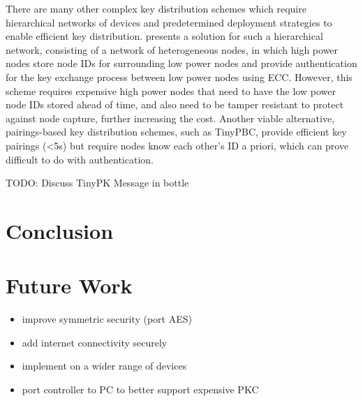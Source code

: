 \documentclass[conference]{./sty/IEEEtran}
\begin{document}
There are many other complex key distribution schemes which require hierarchical networks of devices \cite{MizanurRahman2010858,Shi2013235} and predetermined deployment strategies to enable efficient key distribution. \cite{MizanurRahman2010858} presents a solution for such a hierarchical network, consisting of a network of heterogeneous nodes, in which high power nodes store node IDs for surrounding low power nodes and provide authentication for the key exchange process between low power nodes using ECC. However, this scheme requires expensive high power nodes that need to have the low power node IDs stored ahead of time, and also need to be tamper resistant to protect against node capture, further increasing the cost. Another viable alternative, pairings-based key distribution schemes, such as TinyPBC\cite{TinyPBC}, provide efficient key pairings (\textless5s) but require nodes know each other's ID a priori, which can prove difficult to do with authentication. 

TODO: Discuss TinyPK  \cite{TinyPK}Message in bottle \cite{MessageBottle}


\section{Conclusion}
\label{sec:conclusion}

\section{Future Work} %
\label{sec:future_work}

\begin{itemize}
  \item improve symmetric security (port AES)
  \item add internet connectivity securely
  \item implement on a wider range of devices
  \item port controller to PC to better support expensive PKC
\end{itemize}



\end{document}
